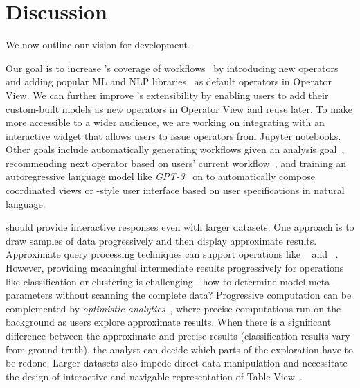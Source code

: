 \section{Discussion}
\label{sec:discussion}





We now outline our vision for \system development.

Our goal is to increase \system's coverage of \vita workflows~\cite{liu2018bridging} by introducing new \vta operators and adding popular ML and NLP libraries~\cite{mlbazaar} as default operators in Operator View. We can further improve \system's extensibility by enabling users to add their custom-built models as new operators in Operator View and reuse later. To make \vta more accessible to a wider audience, we are working on integrating \vta with an interactive widget that allows users to issue \vta operators from Jupyter notebooks. Other goals include 
automatically generating \vita workflows given an analysis goal~\cite{bar2020automatically}, recommending next operator based on users' current workflow~\cite{yan2020auto}, and training
an autoregressive language model like \emph{GPT-3}~\cite{brown2020language} on \vta to automatically compose coordinated views or \system-style user interface based on user specifications in natural language.

\system should provide interactive responses even with larger datasets. One approach is to
draw samples of data progressively and then display approximate results. 
Approximate query processing techniques can support operations
like ~\cite{babcock2003dynamic, agarwal2013blinkdb,acharya1999aqua} and ~\cite{rahman2017ve,hellerstein1997online}.
However, providing meaningful intermediate results progressively for operations like classification
or clustering is challenging---how to
determine model meta-parameters without
scanning the complete data? 
Progressive computation can be complemented by \emph{optimistic analytics}~\cite{moritz2017trust}, where precise computations run on the background as users explore approximate results. When there is a significant difference between
the approximate and precise results (\eg classification results vary from ground truth), the analyst can decide
which parts of the exploration have to be redone.
Larger datasets also impede direct data manipulation and necessitate the design of interactive and navigable representation of Table View~\cite{bendre2019faster}.

